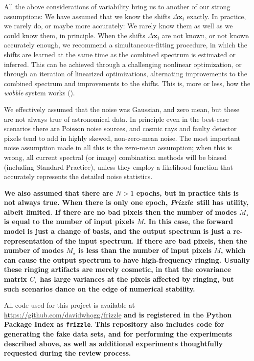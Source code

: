 \documentclass[modern, linenumbers]{aastex631}
\newcommand{\name}{\textsl{Frizzle}}
\newcommand{\modified}[1]{\textcolor{Emerald}{\textbf{#1}}}
\begin{document}
All the above considerations of variability bring us to another of our strong assumptions:
We have assumed that we know the shifts \modified{$\Delta\mathbf{x}_i$} exactly.
In practice, we rarely do, or maybe more accurately: We rarely know them as well as we could know them, in principle.
When the shifts \modified{$\Delta\mathbf{x}_i$} are not known, or not known accurately enough, we recommend a simultaneous-fitting procedure, in which the shifts are learned at the same time as the combined spectrum is estimated or inferred.
This can be achieved through a challenging nonlinear optimization, or through an iteration of linearized optimizations, alternating improvements to the combined spectrum and improvements to the shifts.
This is, more or less, how the \textsl{wobble} system works (\citealt{wobble}).

We effectively assumed that the noise was Gaussian, and zero mean, but these are not always true of astronomical data.
In principle even in the best-case scenarios there are Poisson noise sources, and cosmic rays and faulty detector pixels tend to add in highly skewed, non-zero-mean noise.
The most important noise assumption made in all this is the zero-mean assumption; when this is wrong, all current spectral (or image) combination methods will be biased (including Standard Practice), unless they employ a likelihood function that accurately represents the detailed noise statistics.

\modified{We also assumed that there are $N > 1$ epochs, but in practice this is not always true. When there is only one epoch, \name\ still has utility, albeit limited. If there are no bad pixels then the number of modes $M_\star$ is equal to the number of input pixels $M$. In this case, the forward model is just a change of basis, and the output spectrum is just a re-representation of the input spectrum. If there are bad pixels, then the number of modes $M_\star$ is less than the number of input pixels $M$, which can cause the output spectrum to have high-frequency ringing. Usually these ringing artifacts are merely cosmetic, in that the covariance matrix $C_\star$ has large variances at the pixels affected by ringing, but such scenarios dance on the edge of numerical stability.}

All code used for this project is available at \url{https://github.com/davidwhogg/frizzle} \modified{and is registered in the Python Package Index as \texttt{frizzle}}. \modified{This repository also includes code for generating the fake data sets, and for performing the experiments described above, as well as additional experiments thoughtfully requested during the review process.}
\end{document}
